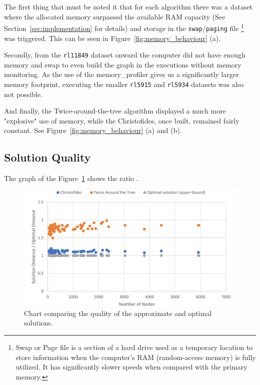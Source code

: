 \documentclass[12pt]{article}
\begin{document}
The first thing that must be noted it that for each algorithm there was a dataset where the allocated memory surpassed 
the available RAM capacity (See Section~\ref{sec:implementation} for details) and storage in the \texttt{swap}/\texttt{paging} 
file 
\footnote{Swap or Page file is a section of a hard drive used as a temporary location to store information 
when the computer's RAM (random-access memory) is fully utilized. It has significantly slower speeds when 
compared with the primary memory.} 
was triggered. This can be seen in Figure~\ref{fig:memory_behaviour} (a).

Secondly, from the \texttt{rl11849} dataset onward the computer did not have enough memory and swap to 
even build the graph in the executions without memory monitoring. As the use of the memory_profiler gives us 
a significantly larger memory footprint, executing the smaller \texttt{rl5915} and \texttt{rl5934} datasets 
was also not possible.

And finally, the Twice-around-the-tree algorithm displayed a much more "explosive" use of 
memory, while the Christofides, once built, remained fairly constant. See Figure~\ref{fig:memory_behaviour} (a) and (b).

\subsection{Solution Quality} \label{sec:exp_quality}

The graph of the Figure~\ref{fig:quality_ratio} shows the ratio .

\begin{figure}[ht]
\centering
\includegraphics[height=.325\textheight]{quality_ratio.png}
\caption{Chart comparing the quality of the approximate and optimal solutions.}
\label{fig:quality_ratio}
\end{figure}
\end{document}
